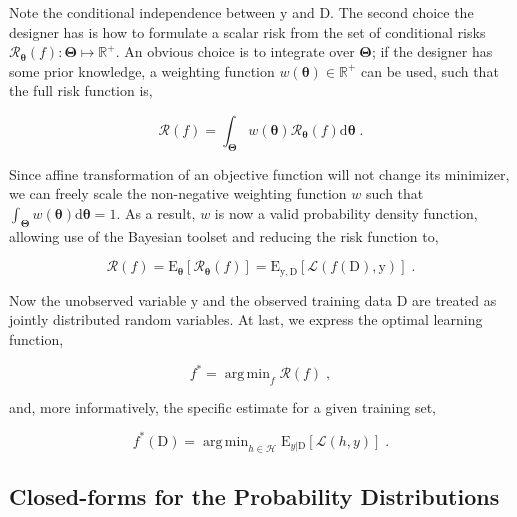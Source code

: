 \documentclass[12pt]{article}
\DeclareMathOperator*{\argmin}{arg\,min}
\begin{document}
Note the conditional independence between $\mathrm{y}$ and $\mathrm{D}$. The second choice the designer has is how to formulate a scalar risk from the set of conditional risks $\mathcal{R}_{\bm{\theta}}(f): \bm{\Theta} \mapsto \mathbb{R}^+$. An obvious choice is to integrate over $\bm{\Theta}$; if the designer has some prior knowledge, a weighting function $w(\bm{\theta}) \in \mathbb{R}^+$ can be used, such that the full risk function is,

\begin{equation}
\mathcal{R}(f) = \int_{\bm{\Theta}} w(\bm{\theta}) \mathcal{R}_{\bm{\theta}}(f)\mathrm{d}\bm{\theta} \;.
\end{equation}

Since affine transformation of an objective function will not change its minimizer, we can freely scale the non-negative weighting function $w$ such that $\int_{\bm{\Theta}} w(\bm{\theta}) \mathrm{d}\bm{\theta} = 1$. As a result, $w$ is now a valid probability density function, allowing use of the Bayesian toolset and reducing the risk function to,   

\begin{equation}
\mathcal{R}(f) = \text{E}_{\bm{\theta}}\left[  \mathcal{R}_{\bm{\theta}}(f) \right] = \text{E}_{\mathrm{y},\mathrm{D}}\left[ \mathcal{L}(f(\mathrm{D}),\mathrm{y}) \right] \;.
\end{equation}

Now the unobserved variable $\mathrm{y}$ and the observed training data $\mathrm{D}$ are treated as jointly distributed random variables. At last, we express the optimal learning function,

\begin{equation}
f^* = \argmin_{f} \mathcal{R}(f) \;,
\end{equation}

and, more informatively, the specific estimate for a given training set, 

\begin{equation} \label{f_opt_general}
f^*(\mathrm{D}) = \argmin_{h \in \mathcal{H}} \text{E}_{y|\mathrm{D}}\left[ \mathcal{L}(h,y) \right] \;.
\end{equation}





\subsection{Closed-forms for the Probability Distributions}
\end{document}
